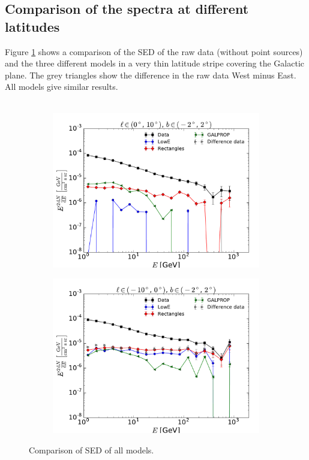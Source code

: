 \subsection{Comparison of the spectra at different latitudes}

Figure \ref{fig:SED_all} shows a comparison of the SED of the raw data (without point sources) and the three different models in a very thin latitude stripe covering the Galactic plane. The grey triangles show the difference in the raw data West minus East. All models give similar results. \\
\\
\begin{figure}[h!]
    \begin{subfigure}{0.5\textwidth}
        \includegraphics[width=\textwidth]{plots/SED_all_models_source_l=5_b=0.pdf}
    \end{subfigure} 
    \begin{subfigure}{0.5\textwidth}
        \includegraphics[width=\textwidth]{plots/SED_all_models_source_l=-5_b=0.pdf}
    \end{subfigure}
  	\caption{Comparison of SED of all models.}
  	\label{fig:SED_all}
\end{figure}

